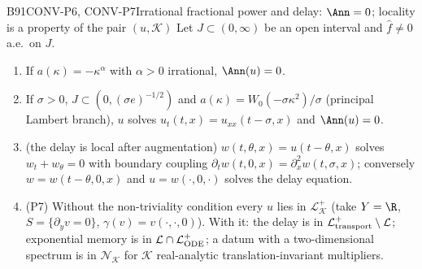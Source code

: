 \begin{dimcard}{B91}{CONV-P6, CONV-P7}{Irrational fractional power and delay: $\Ann=0$; locality is a property of the pair $(u,\mathcal K)$}{\proved}{}
Let $J\subset(0,\infty)$ be an open interval and $\hat f\ne0$ a.e.\ on $J$.
\begin{enumerate}[label=(\alph*)]
\item If $a(\kappa)=-\kappa^\alpha$ with $\alpha>0$ irrational, $\Ann(u)=0$.
\item If $\sigma>0$, $J\subset(0,(\sigma e)^{-1/2})$ and $a(\kappa)=W_0(-\sigma\kappa^2)/\sigma$ (principal Lambert branch), $u$ solves $u_t(t,x)=u_{xx}(t-\sigma,x)$ and $\Ann(u)=0$.
\item (the delay is local after augmentation) $w(t,\theta,x)=u(t-\theta,x)$ solves $w_t+w_\theta=0$ with boundary coupling $\partial_tw(t,0,x)=\partial_x^2w(t,\sigma,x)$; conversely $w=w(t-\theta,0,x)$ and $u=w(\cdot,0,\cdot)$ solves the delay equation.
\item (P7) Without the non-triviality condition every $u$ lies in $\mathcal L^+_{\mathcal K}$ (take $Y=\R$, $S=\{\partial_yv=0\}$, $\gamma(v)=v(\cdot,\cdot,0)$). With it: the delay is in $\mathcal L^+_{\rm transport}\setminus\mathcal L$; exponential memory is in $\mathcal L\cap\mathcal L^+_{\rm ODE}$; a datum with a two-dimensional spectrum is in $\mathcal N_{\mathcal K}$ for $\mathcal K$ real-analytic translation-invariant multipliers.
\end{enumerate}
\end{dimcard}

